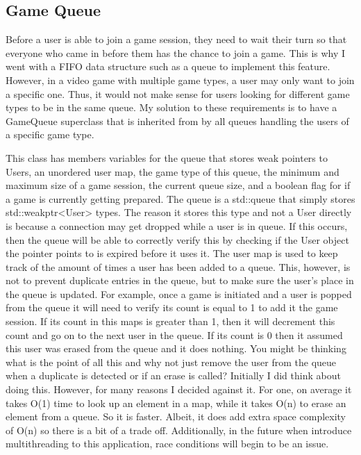 \documentclass[conference]{IEEEtran}
\begin{document}
\subsection{Game Queue}
Before a user is able to join a game session, they need to wait their turn so that everyone who came in before them has the chance to join a game. 
This is why I went with a FIFO data structure such as a queue to implement this feature. 
However, in a video game with multiple game types, a user may only want to join a specific one.
Thus, it would not make sense for users looking for different game types to be in the same queue.
My solution to these requirements is to have a GameQueue superclass that is inherited from by all queues handling the users of a specific game type. \par
This class has members variables for the queue that stores weak pointers to Users, an unordered user map, the game type of this queue, the minimum and maximum size of a game session, the current queue size, and a boolean flag for if a game is currently getting prepared.
The queue is a std::queue that simply stores std::weak\textunderscore ptr<User> types. The reason it stores this type and not a User directly is because a connection may get dropped while a user is in queue.
If this occurs, then the queue will be able to correctly verify this by checking if the User object the pointer points to is expired before it uses it.
The user map is used to keep track of the amount of times a user has been added to a queue.
This, however, is not to prevent duplicate entries in the queue, but to make sure the user’s place in the queue is updated.
For example, once a game is initiated and a user is popped from the queue it will need to verify its count is equal to 1 to add it the game session.
If its count in this maps is greater than 1, then it will decrement this count and go on to the next user in the queue.
If its count is 0 then it assumed this user was erased from the queue and it does nothing.
You might be thinking what is the point of all this and why not just remove the user from the queue when a duplicate is detected or if an erase is called?
Initially I did think about doing this.
However, for many reasons I decided against it.
For one, on average it takes O(1) time to look up an element in a map, while it takes O(n) to erase an element from a queue.
So it is faster.
Albeit, it does add extra space complexity of O(n) so there is a bit of a trade off.
Additionally, in the future when introduce multithreading to this application, race conditions will begin to be an issue.
\end{document}
